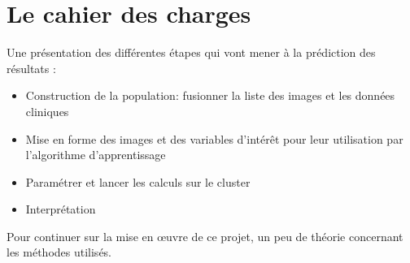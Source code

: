 \section{Le cahier des charges}

Une présentation des différentes étapes qui vont mener à la prédiction des résultats :

\begin{itemize}
 \item Construction de la population: fusionner la liste des images et les données cliniques
 \item Mise en forme des images et des variables d'intérêt pour leur utilisation par l'algorithme d'apprentissage
 \item Paramétrer et lancer les calculs sur le cluster
 \item Interprétation
\end{itemize}

Pour continuer sur la mise en œuvre de ce projet, un peu de théorie concernant les méthodes utilisés. 